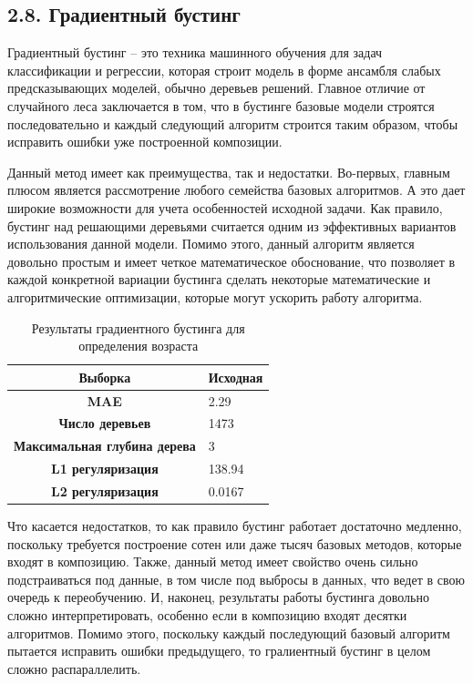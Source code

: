 \subsection{2.8. Градиентный бустинг}

Градиентный бустинг \cite{gradient boosting} -- это техника машинного обучения для задач классификации и регрессии, которая строит модель в форме ансамбля слабых предсказывающих моделей, обычно деревьев решений. Главное отличие от случайного леса заключается в том, что в бустинге базовые модели строятся последовательно и каждый следующий алгоритм строится таким образом, чтобы исправить ошибки уже построенной композиции.

Данный метод имеет как преимущества, так и недостатки. Во-первых, главным плюсом является рассмотрение любого семейства базовых алгоритмов. А это дает широкие возможности для учета особенностей исходной задачи. Как правило, бустинг над решающими деревьями считается одним из эффективных вариантов использования данной модели. Помимо этого, данный алгоритм является довольно простым и имеет четкое математическое обоснование, что позволяет в каждой конкретной вариации бустинга сделать некоторые математические и алгоритмические оптимизации, которые могут ускорить работу алгоритма.

\setlength\extrarowheight{8pt}
\begin{table}[h!]
\centering
\begin{tabular}{|c|l|}
\hline
\textbf{Выборка}            & Исходная \\ \hline
\textbf{MAE}                & 2.29  \\ \hline
\textbf{Число деревьев}      & 1473     \\ \hline
\textbf{Максимальная глубина дерева}         & 3        \\ \hline
\textbf{L1 регуляризация}         & 138.94   \\ \hline
\textbf{L2 регуляризация}        & 0.0167   \\ \hline
\end{tabular}
\caption{Результаты градиентного бустинга для определения возраста}
\label{gradient boosting age table}
\end{table}

Что касается недостатков, то  как правило бустинг работает достаточно медленно, поскольку требуется построение сотен или даже тысяч базовых методов, которые входят в композицию. Также, данный метод имеет свойство очень сильно подстраиваться под данные, в том числе под выбросы в данных, что ведет в свою очередь к переобучению. И, наконец, результаты работы бустинга довольно сложно интерпретировать, особенно
если в композицию входят десятки алгоритмов.  Помимо этого, поскольку каждый последующий базовый алгоритм пытается исправить ошибки предыдущего, то гралиентный бустинг в целом сложно распараллелить.




